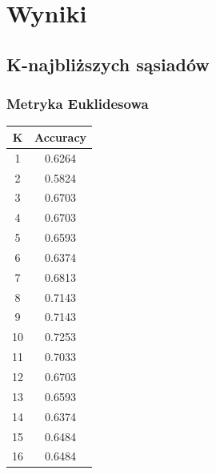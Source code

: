 \documentclass{classrep}
\begin{document}
    \section{Wyniki}
    \label{results} {

        \subsection{K-najbliższych sąsiadów}
        \label{knn_results} {

            \subsubsection{Metryka Euklidesowa}
            \label{knn_results_eucl} {

                \begin{table}[!htbp]
                    \begin{minipage}{.35\textwidth}
                        \centering
                        \begin{tabular}{|c|c|}
                            \hline
                            K & Accuracy \\ \hline
                            1 & 0.6264 \\ \hline
                            2 & 0.5824 \\ \hline
                            3 & 0.6703 \\ \hline
                            4 & 0.6703 \\ \hline
                            5 & 0.6593 \\ \hline
                            6 & 0.6374 \\ \hline
                            7 & 0.6813 \\ \hline
                            8 & 0.7143 \\ \hline
                            9 & 0.7143 \\ \hline
                            10 & 0.7253 \\ \hline
                            11 & 0.7033 \\ \hline
                            12 & 0.6703 \\ \hline
                            13 & 0.6593 \\ \hline
                            14 & 0.6374 \\ \hline
                            15 & 0.6484 \\ \hline
                            16 & 0.6484 \\ \hline

\end{tabular}
\end{minipage}
\end{table}}}}
\end{document}
